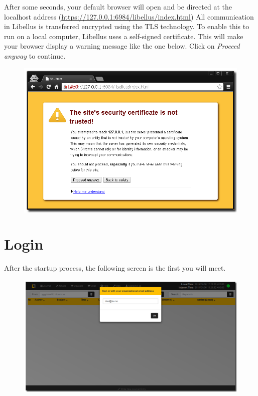 \documentclass[letterpaper,10pt,english]{sphinxmanual}
\begin{document}
After some seconds, your default browser will open and be directed at the localhost address (\href{https://127.0.0.1:6984/libellus/index.html}{https://127.0.0.1:6984/libellus/index.html})
All communication in Libellus is transferred encrypted using the TLS technology. To enable this to run on a local computer, Libellus uses a self-signed certificate. This will make your browser display a warning message like the one below. Click on \emph{Proceed anyway} to continue.
\begin{figure}[htbp]
\centering

\includegraphics{ssl.png}
\end{figure}


\section{Login}
\label{User manual:login}
After the startup process, the following screen is the first you will meet.
\begin{figure}[htbp]
\centering

\includegraphics{startscreen.png}
\end{figure}
\end{document}
